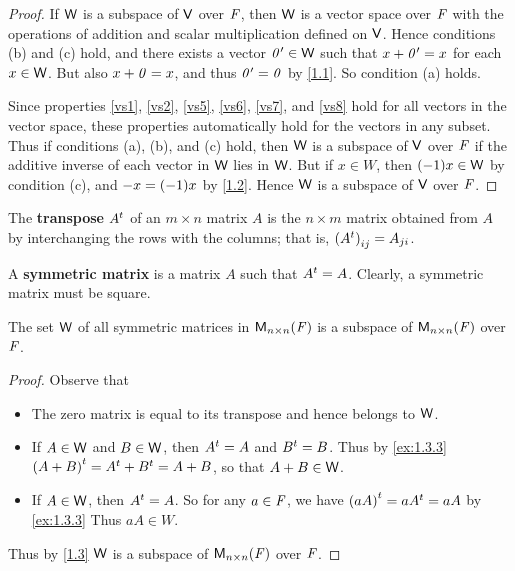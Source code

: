 \begin{proof}
  If \(\mathsf{W}\) is a subspace of \(\mathsf{V}\) over \(\mathit{F}\), then \(\mathsf{W}\) is a vector space over \(\mathit{F}\) with the operations of addition and scalar multiplication defined on \(\mathsf{V}\).
  Hence conditions (b) and (c) hold, and there exists a vector \(\mathit{0}' \in \mathsf{W}\) such that \(x + \mathit{0}' = x\) for each \(x \in \mathsf{W}\).
  But also \(x + \mathit{0} = x\), and thus \(\mathit{0}' = \mathit{0}\) by \cref{1.1}.
  So condition (a) holds.

  Since properties \ref{vs1}, \ref{vs2}, \ref{vs5}, \ref{vs6}, \ref{vs7}, and \ref{vs8} hold for all vectors in the vector space, these properties automatically hold for the vectors in any subset.
  Thus if conditions (a), (b), and (c) hold, then \(\mathsf{W}\) is a subspace of \(\mathsf{V}\) over \(\mathit{F}\) if the additive inverse of each vector in \(\mathsf{W}\) lies in \(\mathsf{W}\).
  But if \(x \in W\), then \(\p{-1} x \in \W\) by condition (c), and \(-x = \p{-1} x\) by \cref{1.2}.
  Hence \(\mathsf{W}\) is a subspace of \(\mathsf{V}\) over \(\mathit{F}\).
\end{proof}

\begin{defn}\label{1.3.3}
  The \textbf{transpose} \({A}^{t}\) of an \(m \times n\) matrix \(A\) is the \(n \times m\) matrix obtained from \(A\) by interchanging the rows with the columns;
  that is, \(\left\lparen{A}^{t}\right\rparen_{i j} = A_{j i}\).
\end{defn}

\begin{defn}\label{1.3.4}
  A \textbf{symmetric matrix} is a matrix \(A\) such that \({A}^{t} = A\).
  Clearly, a symmetric matrix must be square.
\end{defn}

\begin{eg}\label{1.3.5}
  The set \(\mathsf{W}\) of all symmetric matrices in \(\mathsf{M}_{{n} \times n}({\mathit{F}})\) is a subspace of \(\mathsf{M}_{{n} \times n}({\mathit{F}})\) over \(\mathit{F}\).
\end{eg}

\begin{proof}
  Observe that
  \begin{itemize}
    \item The zero matrix is equal to its transpose and hence belongs to \(\mathsf{W}\).
    \item If \(A \in \mathsf{W}\) and \(B \in \mathsf{W}\), then \({A}^{t} = A\) and \({B}^{t} = B\).
          Thus by \cref{ex:1.3.3} \({\left\lparen A + B\right\rparen}^{t} = {A}^{t} + {B}^{t} = A + B\), so that \(A + B \in \mathsf{W}\).
    \item If \(A \in \mathsf{W}\), then \({A}^{t} = A\).
          So for any \(a \in \mathit{F}\), we have \({\left\lparen aA\right\rparen}^{t} = a{A}^{t} = aA\) by \cref{ex:1.3.3}
          Thus \(aA \in W\).
  \end{itemize}
  Thus by \cref{1.3} \(\mathsf{W}\) is a subspace of \(\mathsf{M}_{{n} \times n}({\mathit{F}})\) over \(\mathit{F}\).
\end{proof}

